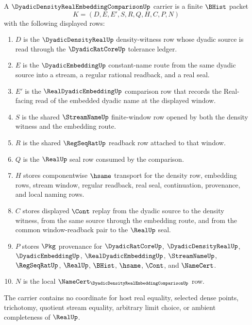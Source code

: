 \begin{definition}
\label{def:dyadic-density-real-embedding-comparison-carrier}
A $\DyadicDensityRealEmbeddingComparisonUp$ carrier is a finite $\BHist$
packet
$$
K=(D,E,E',S,R,Q,H,C,P,N)
$$
with the following displayed rows:
\begin{enumerate}
\item $D$ is the $\DyadicDensityRealUp$ density-witness row whose dyadic
source is read through the $\DyadicRatCoreUp$ tolerance ledger.
\item $E$ is the $\DyadicEmbeddingUp$ constant-name route from the same
dyadic source into a stream, a regular rational readback, and a real seal.
\item $E'$ is the $\RealDyadicEmbeddingUp$ comparison row that records the
Real-facing read of the embedded dyadic name at the displayed window.
\item $S$ is the shared $\StreamNameUp$ finite-window row opened by both the
density witness and the embedding route.
\item $R$ is the shared $\RegSeqRatUp$ readback row attached to that window.
\item $Q$ is the $\RealUp$ seal row consumed by the comparison.
\item $H$ stores componentwise $\hsame$ transport for the density row,
embedding rows, stream window, regular readback, real seal, continuation,
provenance, and local naming rows.
\item $C$ stores displayed $\Cont$ replay from the dyadic source to the
density witness, from the same source through the embedding route, and from
the common window-readback pair to the $\RealUp$ seal.
\item $P$ stores $\Pkg$ provenance for $\DyadicRatCoreUp$,
$\DyadicDensityRealUp$, $\DyadicEmbeddingUp$, $\RealDyadicEmbeddingUp$,
$\StreamNameUp$, $\RegSeqRatUp$, $\RealUp$, $\BHist$, $\hsame$, $\Cont$,
and $\NameCert$.
\item $N$ is the local
$\NameCert_{\DyadicDensityRealEmbeddingComparisonUp}$ row.
\end{enumerate}
The carrier contains no coordinate for host real equality, selected dense
points, trichotomy, quotient stream equality, arbitrary limit choice, or
ambient completeness of $\RealUp$.
\end{definition}

